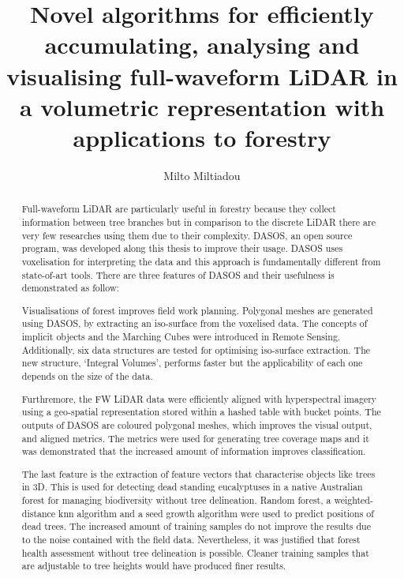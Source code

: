 \documentclass[11pt,nofootinbib]{report}
\title{ Novel algorithms for efficiently accumulating, analysing and visualising full-waveform LiDAR in a volumetric representation with applications to forestry}
\author{Milto Miltiadou}
\begin{document}
	\maketitle
 		
\begin{abstract}	
   
     \par Full-waveform LiDAR are particularly useful in forestry because they collect information between tree branches but in comparison to the discrete LiDAR there are very few researches using them due to their complexity. DASOS, an open source program, was developed along this thesis to improve their usage. DASOS uses voxelisation for interpreting the data and this approach is fundamentally different from state-of-art tools. There are three features of DASOS and their usefulness is demonstrated as follow: 
     \par Visualisations of forest improves field work planning. Polygonal meshes are generated using DASOS, by extracting an iso-surface from the voxelised data. The concepts of implicit objects and the Marching Cubes were introduced in Remote Sensing. Additionally, six data structures are tested for optimising iso-surface extraction. The new structure, `Integral Volumes', performs faster but the applicability of each one depends on the size of the data.
     \par Furthremore, the FW LiDAR data were efficiently aligned with hyperspectral imagery using a geo-spatial representation stored within a hashed table with bucket points. The outputs of DASOS are coloured polygonal meshes, which improves the visual output, and aligned metrics. The metrics were used for generating tree coverage maps and it was demonstrated that the increased amount of information improves classification. 
     \par The last feature is the extraction of feature vectors that characterise objects like trees in 3D. This is used for detecting dead standing eucalyptuses in a native Australian forest for managing biodiversity without tree delineation.  Random forest, a weighted-distance knn algorithm and a seed growth algorithm were used to predict positions of dead trees. The increased amount of training samples do not improve the results due to the noise contained with the field data. Nevertheless, it was justified that forest health assessment without tree delineation is possible. Cleaner training samples that are adjustable to tree heights would have produced finer results.  
     
    
     \thispagestyle{empty}
\end{abstract}
\end{document}
